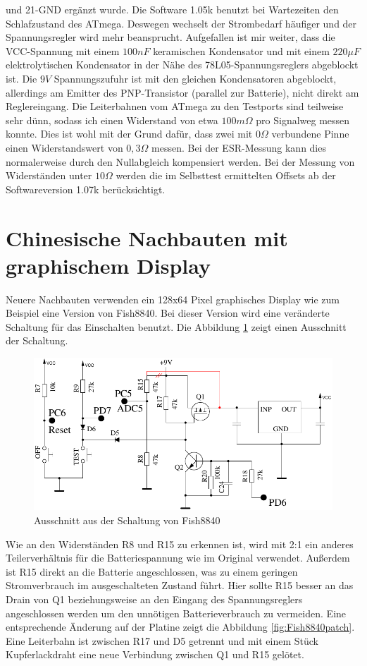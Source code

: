 und 21-GND ergänzt wurde. Die Software 1.05k benutzt bei Wartezeiten den Schlafzustand des ATmega.
Deswegen wechselt der Strombedarf häufiger und der Spannungsregler wird mehr beansprucht.
Aufgefallen ist mir weiter, dass die VCC-Spannung mit einem \(100nF\) keramischen Kondensator und mit
einem \(220\mu F\) elektrolytischen Kondensator in der Nähe des 78L05-Spannungsreglers abgeblockt ist.
Die \(9V\) Spannungszufuhr ist mit den gleichen Kondensatoren abgeblockt, allerdings am Emitter des PNP-Transistor
(parallel zur Batterie), nicht direkt am Reglereingang.
Die Leiterbahnen vom ATmega zu den Testports sind teilweise sehr dünn, sodass ich einen Widerstand
von etwa \(100m\Omega\) pro Signalweg messen konnte. Dies ist wohl mit der Grund dafür, dass zwei
mit \(0\Omega\) verbundene Pinne einen Widerstandswert von \(0,3\Omega\) messen.
Bei der ESR-Messung kann dies normalerweise durch den Nullabgleich kompensiert werden.
Bei der Messung von Widerständen unter \(10\Omega\) werden die im Selbsttest ermittelten Offsets 
ab der Softwareversion 1.07k berücksichtigt.

\section{Chinesische Nachbauten mit graphischem Display}
Neuere Nachbauten verwenden ein 128x64 Pixel graphisches Display wie zum Beispiel eine Version von Fish8840.
Bei dieser Version wird eine veränderte Schaltung für das Einschalten benutzt. Die Abbildung \ref{fig:Fish8840}
zeigt einen Ausschnitt der Schaltung.

\begin{figure}[H]
\centering
\includegraphics[width=.7\textwidth]{../FIG/Fish8840.pdf}	%
\caption{Ausschnitt aus der Schaltung von Fish8840}
\label{fig:Fish8840}
\end{figure}

Wie an den Widerständen R8 und R15 zu erkennen ist, 
wird mit 2:1 ein anderes Teilerverhältnis für die Batteriespannung wie im Original verwendet.
Außerdem ist R15 direkt an die Batterie angeschlossen, was zu einem geringen Stromverbrauch im
ausgeschalteten Zustand führt. Hier sollte R15 besser an das Drain von Q1 beziehungsweise an den
Eingang des Spannungsreglers angeschlossen werden um den unnötigen Batterieverbrauch zu vermeiden.
Eine entsprechende Änderung auf der Platine zeigt die Abbildung \ref{fig:Fish8840patch}.
Eine Leiterbahn ist zwischen R17 und D5 getrennt und mit einem Stück Kupferlackdraht eine
neue Verbindung zwischen Q1 und R15 gelötet.

